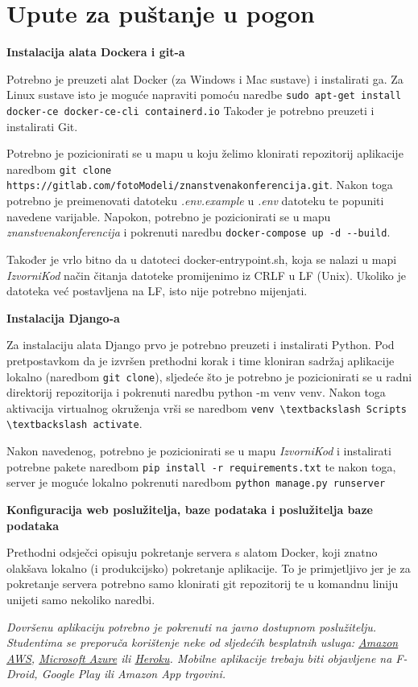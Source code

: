 			\eject 
		
		\section{Upute za puštanje u pogon}

			\textbf{Instalacija alata Dockera i git-a}

			Potrebno je preuzeti alat Docker (za Windows i Mac sustave) i instalirati ga. Za Linux sustave isto je moguće napraviti pomoću naredbe \verb|sudo apt-get install docker-ce docker-ce-cli containerd.io| Također je potrebno preuzeti i instalirati Git.

			Potrebno je pozicionirati se u mapu u koju želimo klonirati repozitorij aplikacije naredbom \verb|git clone https://gitlab.com/fotoModeli/znanstvenakonferencija.git|. Nakon toga potrebno je preimenovati datoteku \textit{.env.example} u \textit{.env} datoteku te popuniti navedene varijable. Napokon, potrebno je pozicionirati se u mapu \textit{znanstvenakonferencija} i pokrenuti naredbu \verb|docker-compose up -d --build|.

			Također je vrlo bitno da u datoteci docker-entrypoint.sh, koja se nalazi u mapi \textit{IzvorniKod} način čitanja datoteke promijenimo iz CRLF u LF (Unix). Ukoliko je datoteka već postavljena na LF, isto nije potrebno mijenjati.

			\textbf{Instalacija Django-a}

			Za instalaciju alata Django prvo je potrebno preuzeti i instalirati Python. Pod pretpostavkom da je izvršen prethodni korak i time kloniran sadržaj aplikacije lokalno (naredbom \verb|git clone|), sljedeće što je potrebno je pozicionirati se u radni direktorij repozitorija i pokrenuti naredbu python -m venv venv. Nakon toga aktivacija virtualnog okruženja vrši se naredbom \verb|venv \textbackslash Scripts \textbackslash activate|.

			Nakon navedenog, potrebno je pozicionirati se u mapu \textit{IzvorniKod} i instalirati potrebne pakete naredbom \verb|pip install -r requirements.txt| te nakon toga, server je moguće lokalno pokrenuti naredbom \verb|python manage.py runserver| 
		\eject
		
			\textbf{Konfiguracija web poslužitelja, baze podataka i poslužitelja baze podataka}

			Prethodni odsječci opisuju pokretanje servera s alatom Docker, koji znatno olakšava lokalno (i produkcijsko) pokretanje aplikacije. To je primjetljivo jer je za pokretanje servera potrebno samo klonirati git repozitorij te u komandnu liniju unijeti samo nekoliko naredbi.

			
			
			 \textit{Dovršenu aplikaciju potrebno je pokrenuti na javno dostupnom poslužitelju. Studentima se preporuča korištenje neke od sljedećih besplatnih usluga: \href{https://aws.amazon.com/}{Amazon AWS}, \href{https://azure.microsoft.com/en-us/}{Microsoft Azure} ili \href{https://www.heroku.com/}{Heroku}. Mobilne aplikacije trebaju biti objavljene na F-Droid, Google Play ili Amazon App trgovini.}
			
			
			\eject 